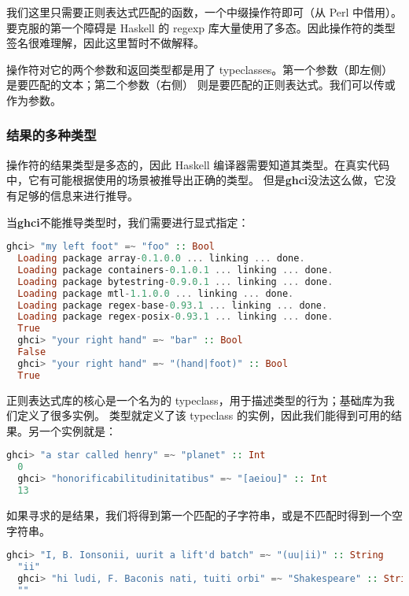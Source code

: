\documentclass[./main.tex]{subfiles}
\begin{document}
我们这里只需要正则表达式匹配的函数，一个中缀操作符\acode{(=~)}即可（从 Perl 中借用）。要克服的第一个障碍是 Haskell 的 regexp
库大量使用了多态。因此\acode{(=~)}操作符的类型签名很难理解，因此这里暂时不做解释。

\acode{=~}操作符对它的两个参数和返回类型都是用了 typeclasses。第一个参数（即\acode{=~}左侧）是要匹配的文本；第二个参数（右侧）
则是要匹配的正则表达式。我们可以传或作为参数。

\subsubsection*{结果的多种类型}

\acode{=~}操作符的结果类型是多态的，因此 Haskell 编译器需要知道其类型。在真实代码中，它有可能根据使用的场景被推导出正确的类型。
但是\textbf{ghci}没法这么做，它没有足够的信息来进行推导。

当\textbf{ghci}不能推导类型时，我们需要进行显式指定：

\begin{lstlisting}[language=Haskell]
  ghci> "my left foot" =~ "foo" :: Bool
  Loading package array-0.1.0.0 ... linking ... done.
  Loading package containers-0.1.0.1 ... linking ... done.
  Loading package bytestring-0.9.0.1 ... linking ... done.
  Loading package mtl-1.1.0.0 ... linking ... done.
  Loading package regex-base-0.93.1 ... linking ... done.
  Loading package regex-posix-0.93.1 ... linking ... done.
  True
  ghci> "your right hand" =~ "bar" :: Bool
  False
  ghci> "your right hand" =~ "(hand|foot)" :: Bool
  True
\end{lstlisting}

正则表达式库的核心是一个名为的 typeclass，用于描述类型的行为；基础库为我们定义了很多实例。
类型就定义了该 typeclass 的实例，因此我们能得到可用的结果。另一个实例就是：

\begin{lstlisting}[language=Haskell]
  ghci> "a star called henry" =~ "planet" :: Int
  0
  ghci> "honorificabilitudinitatibus" =~ "[aeiou]" :: Int
  13
\end{lstlisting}

如果寻求的是结果，我们将得到第一个匹配的子字符串，或是不匹配时得到一个空字符串。

\begin{lstlisting}[language=Haskell]
  ghci> "I, B. Ionsonii, uurit a lift'd batch" =~ "(uu|ii)" :: String
  "ii"
  ghci> "hi ludi, F. Baconis nati, tuiti orbi" =~ "Shakespeare" :: String
  ""
\end{lstlisting}
\end{document}

